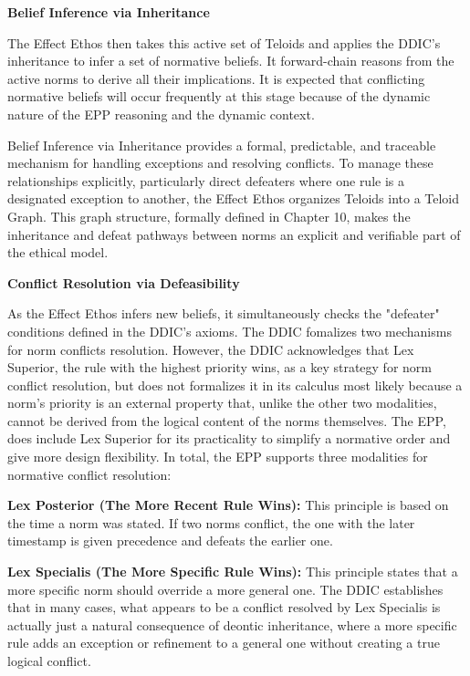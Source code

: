 \textbf{Belief Inference via Inheritance}

The Effect Ethos then takes this active set of Teloids and applies the DDIC's inheritance to infer a set of normative beliefs. It forward-chain reasons from the active norms to derive all their implications. It is expected that conflicting normative beliefs will occur frequently at this stage because of the dynamic nature of the EPP reasoning and the dynamic context. 

Belief Inference via Inheritance provides a formal, predictable, and traceable mechanism for handling exceptions and resolving conflicts. To manage these relationships explicitly, particularly direct defeaters where one rule is a designated exception to another, the Effect Ethos organizes Teloids into a Teloid Graph. This graph structure, formally defined in Chapter 10, makes the inheritance and defeat pathways between norms an explicit and verifiable part of the ethical model.  

\textbf{Conflict Resolution via Defeasibility}

As the Effect Ethos infers new beliefs, it simultaneously checks the "defeater" conditions defined in the DDIC's axioms. The DDIC fomalizes two mechanisms for norm conflicts resolution.  However, the DDIC  acknowledges that Lex Superior, the rule with the highest priority wins, as a key strategy for norm conflict resolution, but does not formalizes it in its calculus most likely because a norm's priority is an external property that, unlike the other two modalities, cannot be derived from the logical content of the norms themselves. The EPP, does include Lex Superior for its practicality to simplify a normative order and give more design flexibility. In total, the EPP supports three modalities for normative conflict resolution:  

\textbf{Lex Posterior (The More Recent Rule Wins):}  This principle is based on the time a norm was stated. If two norms conflict, the one with the later timestamp is given precedence and defeats the earlier one\cite{olson2024DDIC}.

\textbf{Lex Specialis (The More Specific Rule Wins):} This principle states that a more specific norm should override a more general one. The  DDIC establishes that in many cases, what appears to be a conflict resolved by Lex Specialis is actually just a natural consequence of deontic inheritance, where a more specific rule adds an exception or refinement to a general one without creating a true logical conflict\cite{olson2024DDIC}.  

